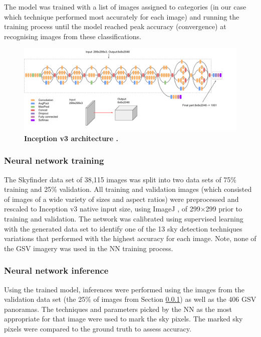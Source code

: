 \documentclass[final,3p,times,authoryear]{elsarticle}
\begin{document}
The model was trained with a list of images assigned to categories (in our case which technique performed most accurately for each image) and running the training process until the model reached peak accuracy (convergence) at recognising images from these classifications.

\begin{figure}
\centering    
\includegraphics[scale=0.33]{Images/2/inceptionv3onc--oview.png}
\caption{\bf Inception v3 architecture \citep{Google2019}.}    
 \label{fig:incetption3}  
\end{figure} 

\subsubsection{Neural network training}\label{sec:nntraining}    

The Skyfinder data set of 38,115 images was split into two data sets of 75\% training and 25\% validation. All training and validation images (which consisted of images of a wide variety of sizes and aspect ratios) were preprocessed and rescaled to Inception v3 native input size, using ImageJ \citep{Rueden2017}, of 299$\times$299 prior to training and validation. The network was calibrated using supervised learning with the generated data set to identify one of the 13 sky detection techniques variations that performed with the highest accuracy for each image. Note, none of the GSV imagery was used in the NN training process.





\subsubsection{Neural network inference}\label{sec:nninference}    
Using the trained model, inferences were performed using the images from the validation data set (the 25\% of images from Section \ref{sec:nntraining}) as well as the 406 GSV panoramas. The techniques and parameters picked by the NN as the most appropriate for that image were used to mark the sky pixels. The marked sky pixels were compared to the ground truth to assess accuracy.
\end{document}
